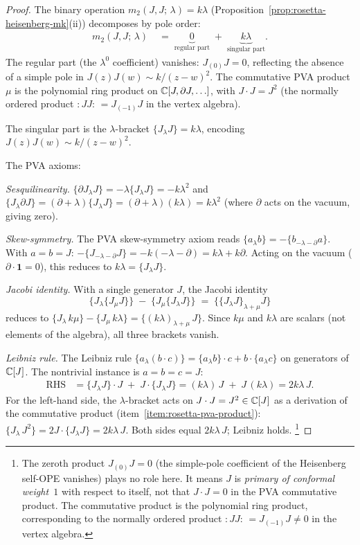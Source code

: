 \begin{proof}
The binary operation $m_2(J, J;\, \lambda) = k\lambda$ (Proposition~\ref{prop:rosetta-heisenberg-mk}(ii)) decomposes by pole order:
\begin{align}
m_2(J, J;\, \lambda)
&\;=\;
\underbrace{0}_{\text{regular part}}
\;+\;
\underbrace{k\lambda}_{\text{singular part}}.
\end{align}
The regular part (the $\lambda^0$ coefficient) vanishes: $J_{(0)}J = 0$, reflecting the absence of a simple pole in $J(z)J(w) \sim k/(z-w)^2$. The commutative PVA product $\mu$ is the polynomial ring product on $\mathbb{C}[J, \partial J, \ldots]$, with $J \cdot J = J^2$ (the normally ordered product $:\!JJ\!:\, = J_{(-1)}J$ in the vertex algebra).

The singular part is the $\lambda$-bracket $\{J_\lambda J\} = k\lambda$, encoding $J(z)J(w) \sim k/(z-w)^2$.

The PVA axioms:

\medskip
\noindent\textit{Sesquilinearity.}\enspace
$\{\partial J_\lambda J\} = -\lambda \{J_\lambda J\} = -k\lambda^2$
and $\{J_\lambda \partial J\} = (\partial + \lambda)\{J_\lambda J\}
= (\partial + \lambda)(k\lambda) = k\lambda^2$
(where $\partial$ acts on the vacuum, giving zero).

\medskip
\noindent\textit{Skew-symmetry.}\enspace
The PVA skew-symmetry axiom reads
$\{a_\lambda b\} = -\{b_{-\lambda - \partial} a\}$.
With $a = b = J$:
$-\{J_{-\lambda - \partial} J\} = -k(-\lambda - \partial) = k\lambda + k\partial$.
Acting on the vacuum ($\partial \cdot \mathbf{1} = 0$), this reduces to $k\lambda = \{J_\lambda J\}$.

\medskip
\noindent\textit{Jacobi identity.}\enspace
With a single generator $J$, the Jacobi identity
\[
\{J_\lambda \{J_\mu J\}\}
\;-\;
\{J_\mu \{J_\lambda J\}\}
\;=\;
\{\{J_\lambda J\}_{\lambda + \mu} J\}
\]
reduces to $\{J_\lambda\, k\mu\} - \{J_\mu\, k\lambda\} = \{(k\lambda)_{\lambda+\mu}\, J\}$.
Since $k\mu$ and $k\lambda$ are scalars (not elements of the algebra), all three brackets vanish.

\medskip
\noindent\textit{Leibniz rule.}\enspace
The Leibniz rule $\{a_\lambda (b \cdot c)\} = \{a_\lambda b\} \cdot c + b \cdot \{a_\lambda c\}$ on generators of $\mathbb{C}[J]$. The nontrivial instance is $a = b = c = J$:
\begin{align*}
\text{RHS}
&= \{J_\lambda J\} \cdot J \;+\; J \cdot \{J_\lambda J\}
= (k\lambda)\, J \;+\; J\, (k\lambda)
= 2k\lambda\, J.
\end{align*}
For the left-hand side, the $\lambda$-bracket acts on $J \cdot J = J^2 \in \mathbb{C}[J]$ as a derivation of the commutative product (item~\ref{item:rosetta-pva-product}): $\{J_\lambda\, J^2\} = 2J \cdot \{J_\lambda J\} = 2k\lambda\, J$. Both sides equal $2k\lambda\, J$; Leibniz holds.%
\footnote{The zeroth product $J_{(0)}J = 0$ (the simple-pole
 coefficient of the Heisenberg self-OPE vanishes) plays no role
 here. It means $J$ is \emph{primary of conformal weight~$1$}
 with respect to itself, not that $J \cdot J = 0$ in the PVA
 commutative product. The commutative product is the polynomial
 ring product, corresponding to the normally ordered product
 $:\!JJ\!:\, = J_{(-1)}J \neq 0$ in the vertex algebra.}
\end{proof}
